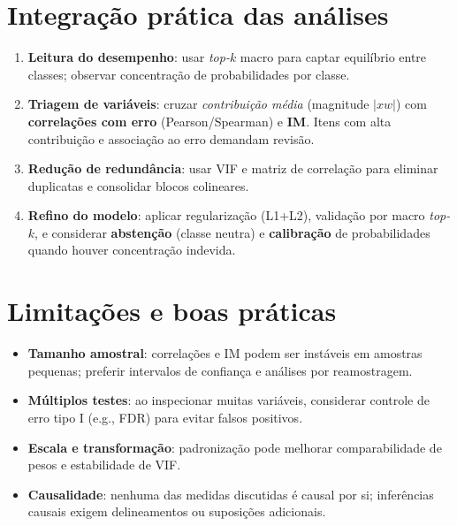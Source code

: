 \documentclass[12pt,a4paper]{article}
\begin{document}
\section{Integração prática das análises}
\begin{enumerate}[leftmargin=1.2cm]
  \item \textbf{Leitura do desempenho}: usar \emph{top-$k$} macro para captar equilíbrio entre classes; observar concentração de probabilidades por classe.
  \item \textbf{Triagem de variáveis}: cruzar \emph{contribuição média} (magnitude $|x w|$) com \textbf{correlações com erro} (Pearson/Spearman) e \textbf{IM}. Itens com alta contribuição e associação ao erro demandam revisão.
  \item \textbf{Redução de redundância}: usar VIF e matriz de correlação para eliminar duplicatas e consolidar blocos colineares.
  \item \textbf{Refino do modelo}: aplicar regularização (L1+L2), validação por macro \emph{top-$k$}, e considerar \textbf{abstenção} (classe neutra) e \textbf{calibração} de probabilidades quando houver concentração indevida.
\end{enumerate}

\section{Limitações e boas práticas}
\begin{itemize}[leftmargin=1.2cm]
  \item \textbf{Tamanho amostral}: correlações e IM podem ser instáveis em amostras pequenas; preferir intervalos de confiança e análises por reamostragem.
  \item \textbf{Múltiplos testes}: ao inspecionar muitas variáveis, considerar controle de erro tipo I (e.g., FDR) para evitar falsos positivos.
  \item \textbf{Escala e transformação}: padronização pode melhorar comparabilidade de pesos e estabilidade de VIF.
  \item \textbf{Causalidade}: nenhuma das medidas discutidas é causal por si; inferências causais exigem delineamentos ou suposições adicionais.
\end{itemize}
\end{document}
